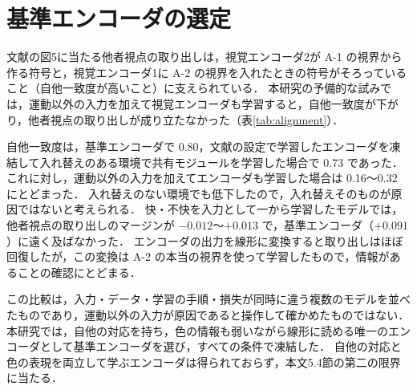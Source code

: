\section{基準エンコーダの選定}\label{app:encoder}
文献\cite{noguchi2022superposition}の図5に当たる他者視点の取り出しは，視覚エンコーダ2が A-1 の視界から作る符号と，視覚エンコーダ1に A-2 の視界を入れたときの符号がそろっていること（自他一致度が高いこと）に支えられている．
本研究の予備的な試みでは，運動以外の入力を加えて視覚エンコーダも学習すると，自他一致度が下がり，他者視点の取り出しが成り立たなかった（表\ref{tab:alignment}）．

\begin{table}[tbp]
  \centering
  \small
  \caption{視覚エンコーダの扱いと自他一致度}
  \label{tab:alignment}
  
\end{table}

自他一致度は，基準エンコーダで 0.80，文献\cite{noguchi2022superposition}の設定で学習したエンコーダを凍結して入れ替えのある環境で共有モジュールを学習した場合で 0.73 であった．
これに対し，運動以外の入力を加えてエンコーダも学習した場合は 0.16〜0.32 にとどまった．
入れ替えのない環境でも低下したので，入れ替えそのものが原因ではないと考えられる．
快・不快を入力として一から学習したモデルでは，他者視点の取り出しのマージンが $-0.012$〜$+0.013$ で，基準エンコーダ（$+0.091$）に遠く及ばなかった．
エンコーダの出力を線形に変換すると取り出しはほぼ回復したが，この変換は A-2 の本当の視界を使って学習したもので，情報があることの確認にとどまる．

この比較は，入力・データ・学習の手順・損失が同時に違う複数のモデルを並べたものであり，運動以外の入力が原因であると操作して確かめたものではない．
本研究では，自他の対応を持ち，色の情報も弱いながら線形に読める唯一のエンコーダとして基準エンコーダを選び，すべての条件で凍結した．
自他の対応と色の表現を両立して学ぶエンコーダは得られておらず，本文5.4節の第二の限界に当たる．
